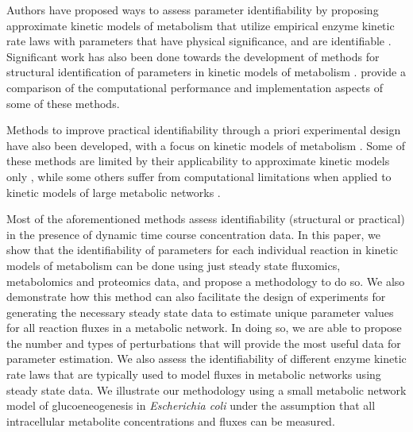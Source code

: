 \documentclass[10pt]{article}
\begin{document}
	Authors have proposed ways to assess parameter identifiability by proposing approximate kinetic models of metabolism that utilize empirical enzyme kinetic rate laws with parameters that have physical significance, and are identifiable \parencite{Heijnen2005,Smallbone2007}. Significant work has also been done towards the development of methods for structural identification of parameters in kinetic models of metabolism \parencite{Ljung1994,Nikerel2009,Berthoumieux2013,Raue2014}. \textcite{Chis2011b} provide a comparison of the computational performance and implementation aspects of some of these methods. 
	
	Methods to improve practical identifiability through a priori experimental design have also been developed, with a focus on kinetic models of metabolism \parencite{Gadkar2005a,Rodriguez-Fernandez2006,Vanlier2014a,Raue2014}. Some of these methods are limited by their applicability to approximate kinetic models only \parencite{Nikerel2009,Berthoumieux2013}, while some others suffer from computational limitations when applied to kinetic models of large metabolic networks \parencite{Gadkar2005a,Raue2014}. 
	
	Most of the aforementioned methods assess identifiability (structural or practical) in the presence of dynamic time course concentration data. In this paper, we show that the identifiability of parameters for each individual reaction in kinetic models of metabolism can be done using just steady state fluxomics, metabolomics and proteomics data, and propose a methodology to do so. We also demonstrate how this method can also facilitate the design of experiments for generating the necessary steady state data to estimate unique parameter values for all reaction fluxes in a metabolic network. In doing so, we are able to propose the number and types of perturbations that will provide the most useful data for parameter estimation. We also assess the identifiability of different enzyme kinetic rate laws that are typically used to model fluxes in metabolic networks using steady state data. We illustrate our methodology using a small metabolic network model of glucoeneogenesis in \textit{Escherichia coli} \parencite{Kotte2014, Srinivasan2017} under the assumption that all intracellular metabolite concentrations and fluxes can be measured. 
		
\end{document}
